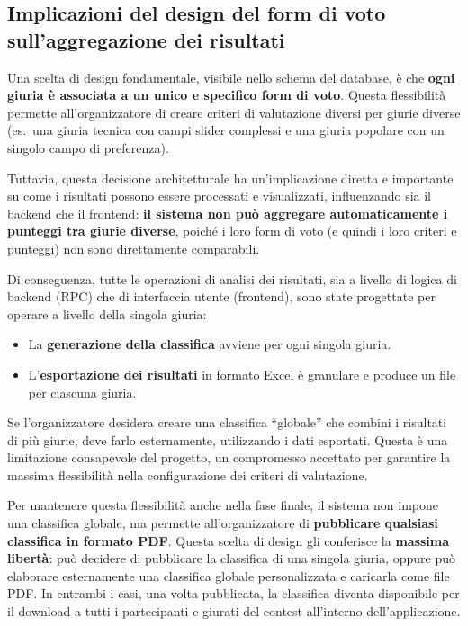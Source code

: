 \subsection{Implicazioni del design del form di voto sull'aggregazione dei risultati}\label{subsec:implicazioni-del-design-del-form-di-voto-sull'aggregazione-dei-risultati}
Una scelta di design fondamentale, visibile nello schema del database, è che \textbf{ogni giuria è associata a un unico e specifico form di voto}.
Questa flessibilità permette all'organizzatore di creare criteri di valutazione diversi per giurie diverse (es.\ una giuria tecnica con campi slider complessi e una giuria popolare con un singolo campo di preferenza).

Tuttavia, questa decisione architetturale ha un'implicazione diretta e importante su come i risultati possono essere processati e visualizzati, influenzando sia il backend che il frontend: \textbf{il sistema non può aggregare automaticamente i punteggi tra giurie diverse}, poiché i loro form di voto (e quindi i loro criteri e punteggi) non sono direttamente comparabili.

Di conseguenza, tutte le operazioni di analisi dei risultati, sia a livello di logica di backend (RPC) che di interfaccia utente (frontend), sono state progettate per operare a livello della singola giuria:
\begin{itemize}
    \item La \textbf{generazione della classifica} avviene per ogni singola giuria.
    \item L'\textbf{esportazione dei risultati} in formato Excel è granulare e produce un file per ciascuna giuria.
\end{itemize}
Se l'organizzatore desidera creare una classifica ``globale'' che combini i risultati di più giurie, deve farlo esternamente, utilizzando i dati esportati.
Questa è una limitazione consapevole del progetto, un compromesso accettato per garantire la massima flessibilità nella configurazione dei criteri di valutazione.

Per mantenere questa flessibilità anche nella fase finale, il sistema non impone una classifica globale, ma permette all'organizzatore di \textbf{pubblicare qualsiasi classifica in formato PDF}.
Questa scelta di design gli conferisce la \textbf{massima libertà}: può decidere di pubblicare la classifica di una singola giuria, oppure può elaborare esternamente una classifica globale personalizzata e caricarla come file PDF. In entrambi i casi, una volta pubblicata, la classifica diventa disponibile per il download a tutti i partecipanti e giurati del contest all'interno dell'applicazione.

